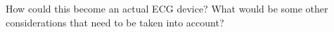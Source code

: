 How could this become an actual ECG device? What would be some other considerations that need to be taken into account?